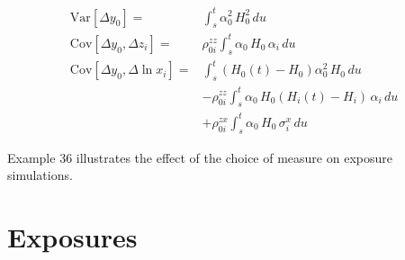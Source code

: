 \begin{align*}
\mathrm{Var}[\Delta y_0] =& \int_s^t \alpha_0^2\,H_0^2\,du \\
\mathrm{Cov}[\Delta y_0, \Delta z_i] =& \rho^{zz}_{0i} \int_s^t \alpha_0\,H_0\,\alpha_i\,du \\
\mathrm{Cov}[\Delta y_0, \Delta \ln x_i] =& \int_s^t \left(H_0(t)-H_0\right) \alpha_0^2\,H_0\,du \\
&  - \rho^{zz}_{0i}\int_s^t \alpha_0\,H_0\left(H_i(t)-H_i\right)\, \alpha_i \,du \\
&  +\rho^{zx}_{0i}\int_s^t \alpha_0 \, H_0\,\sigma^x_i \,du 
\end{align*}

Example 36 illustrates the effect of the choice of measure on exposure simulations.

\section{Exposures}\label{sec:app_exposure}

